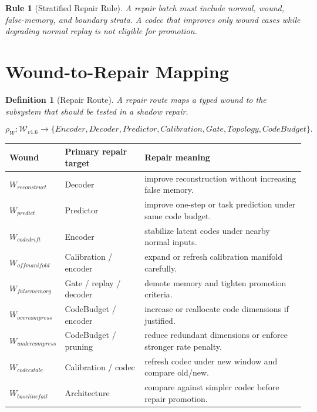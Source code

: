 \documentclass[12pt]{article}
\newtheorem{definition}{Definition}
\newtheorem{rulebox}{Rule}
\begin{document}
\begin{rulebox}[Stratified Repair Rule]
A repair batch must include normal, wound, false-memory, and boundary strata.
A codec that improves only wound cases while degrading normal replay is not
eligible for promotion.
\end{rulebox}

\section{Wound-to-Repair Mapping}

\begin{definition}[Repair Route]
A repair route maps a typed wound to the subsystem that should be tested in a
shadow repair.
\end{definition}

\[
\rho_W: \mathcal{W}_{v1.6}\rightarrow \{Encoder,Decoder,Predictor,Calibration,Gate,Topology,CodeBudget\}.
\]

\begin{longtable}{p{}p{}p{}}
\toprule
\textbf{Wound} & \textbf{Primary repair target} & \textbf{Repair meaning} \\
\midrule
$W_{reconstruct}$ & Decoder & improve reconstruction without increasing false memory. \\
$W_{predict}$ & Predictor & improve one-step or task prediction under same code budget. \\
$W_{codedrift}$ & Encoder & stabilize latent codes under nearby normal inputs. \\
$W_{offmanifold}$ & Calibration / encoder & expand or refresh calibration manifold carefully. \\
$W_{falsememory}$ & Gate / replay / decoder & demote memory and tighten promotion criteria. \\
$W_{overcompress}$ & CodeBudget / encoder & increase or reallocate code dimensions if justified. \\
$W_{undercompress}$ & CodeBudget / pruning & reduce redundant dimensions or enforce stronger rate penalty. \\
$W_{codecstale}$ & Calibration / codec & refresh codec under new window and compare old/new. \\
$W_{baselinefail}$ & Architecture & compare against simpler codec before repair promotion. \\
\bottomrule
\end{longtable}
\end{document}

